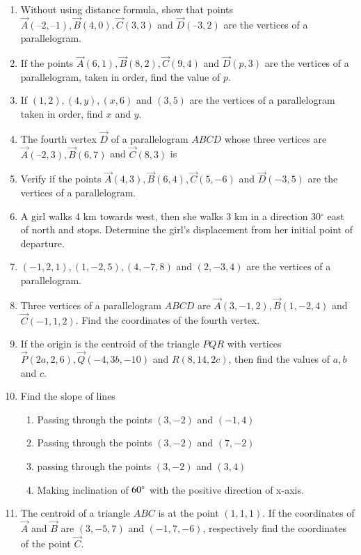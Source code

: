\begin{enumerate}[label=\thesubsection.\arabic*, ref=\thesubsection.\theenumi]
\item Without using distance formula,  show that points $\vec{A}(– 2,  – 1),  \vec{B}(4,  0),  \vec{C}(3,  3)$ and $\vec{D}(–3,  2)$ are the vertices of a parallelogram.
\label{chapters/11/10/1/9}
\\
\solution

\item If the points $\vec{A}(6,  1),  \vec{B}(8,  2),  \vec{C}(9,  4)$ and $\vec{D}(p,  3)$ are the vertices of a parallelogram,  taken in order,  find the value of $p$.
\label{10/7/0/10}
\item 
If $(1,  2),  (4,  y),  (x,  6)$ and $(3,  5)$ are the vertices of a parallelogram taken in order,  find $x$ and $y$.
\label{10/7/2/6}
\item The fourth vertex $\vec{D}$ of a parallelogram $ABCD$ whose three vertices are
	$\vec{A} (–2,  3),  \vec{B} (6,  7)$ and  $\vec{C} (8,  3)$ is
\item Verify if the points $\vec{A}(4, 3),  \vec{B}(6, 4), \vec{C}(5, -6)$  and  $\vec{D}(-3, 5)$ are the vertices of a parallelogram.
\item A girl walks 4 km towards west,  then she walks 3 km in a direction 30$^{\circ}$ east of north and stops. Determine the girl's displacement from her initial point of departure.\\
	\solution
		
\item $(-1, 2, 1),  (1, -2, 5),  (4, -7, 8)$ and $(2, -3, 4)$ are the vertices of a parallelogram.
\item Three vertices of a parallelogram $ABCD$ are $\vec{A}(3, -1, 2),  \vec{B}(1, -2, 4)$ and $\vec{C}(-1, 1, 2)$. Find the coordinates of the fourth vertex.
\item If the origin is the centroid of the triangle $PQR$ with vertices $\vec{P}(2a, 2, 6),  \vec{Q}(-4, 3b, -10)$ and $R(8, 14, 2c)$,  then find the values of $a,  b$ and $c$.
\item Find the slope of lines
\begin{enumerate}
\item  Passing through the points $(3, -2)$ and $(-1, 4)$
\item  Passing through the points $(3, -2)$ and $(7, -2)$
\item  passing through the points $(3, -2)$ and $(3, 4)$	
\item  Making inclination of $60\degree$ with the positive direction of x-axis.
\end{enumerate}
\item The centroid of a triangle $ABC$ is at the point $(1, 1, 1)$. If the coordinates of $\vec{A}$ and $\vec{B}$ are $(3, -5, 7)$ and $(-1, 7, -6)$,  respectively find the coordinates of the point $\vec{C}$.

\end{enumerate}
